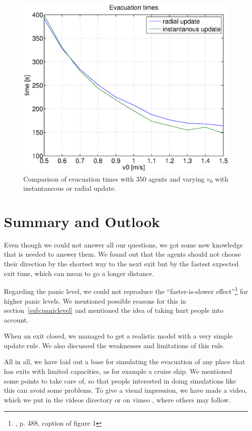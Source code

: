 \documentclass[11pt]{article}
\begin{document}
\begin{figure}[h]
	\centering
	\includegraphics[scale=0.5]{images/evactimescomparefew.eps}
	\caption{Comparison of evacuation times with 350 agents and varying \(v_0\) with instantaneous or radial update. 	}
	\label{evactimescomparefew}
\end{figure}

\FloatBarrier %

\section{Summary and Outlook}

Even though we could not answer all our questions, we got some new knowledge
that is needed to answer them. We found out that the agents should not choose
their direction by the shortest way to the next exit but by the fastest
expected exit time, which can mean to go a longer distance.

Regarding the panic level, we could not reproduce the ``faster-is-slower
effect''\footnote{\cite{helbing}, p. 488, caption of figure 1} for higher panic
levels. We mentioned possible reasons for this in section~\ref{sub:paniclevel}
and mentioned the idea of taking hurt people into account.

When an exit closed, we managed to get a realistic model with a very simple
update rule.  We also discussed the weaknesses and limitations of this rule.

All in all, we have laid out a base for simulating the evacuation of any place
that has exits with limited capacities, as for example a cruise ship.  We
mentioned some points to take care of, so that people interested in doing
simulations like this can avoid some problems. To give a visual impression, we 
have made a video, which we put in the videos directory or on vimeo \cite{vimeo}, where others
may follow.
\end{document}
